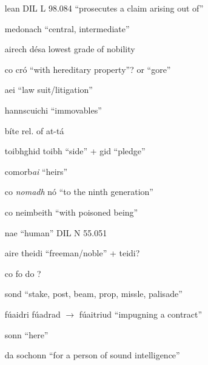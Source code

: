 \documentclass[11pt]{article}
\begin{document}
\begin{enumerate}
  \item[lean] DIL L 98.084 \enquote{prosecutes a claim arising out of}
  \item[medonach] \enquote{central, intermediate}
  \item[airech d\'{e}sa] lowest grade of nobility
  \item[co cr\'{o}] \enquote{with hereditary property}? or \enquote{gore}
  \item[aei] \enquote{law suit/litigation}
  \item[hannscuichi] \enquote{immovables}
  \item[b\'{i}te] rel. of at-t\'{a}
  \item[toibhghid] toibh \enquote{side} + gid \enquote{pledge}
  \item[comorb\emph{ai}] \enquote{heirs}
  \item[co \emph{nomadh} n\'{o}] \enquote{to the ninth generation}
  \item[co neimbeith] \enquote{with poisoned being}
  \item[nae] \enquote{human} DIL N 55.051
  \item[aire theidi] \enquote{freeman/noble} + teidi?
  \item[co fo do] ?
  \item[sond] \enquote{stake, post, beam, prop, missle, palisade}
  \item[f\'{u}aidri] f\'{u}adrad $\rightarrow$ f\'{u}aitriud \enquote{impugning a contract}
  \item[sonn] \enquote{here}
  \item[da sochonn] \enquote{for a person of sound intelligence} 
\end{enumerate}
\end{document}

